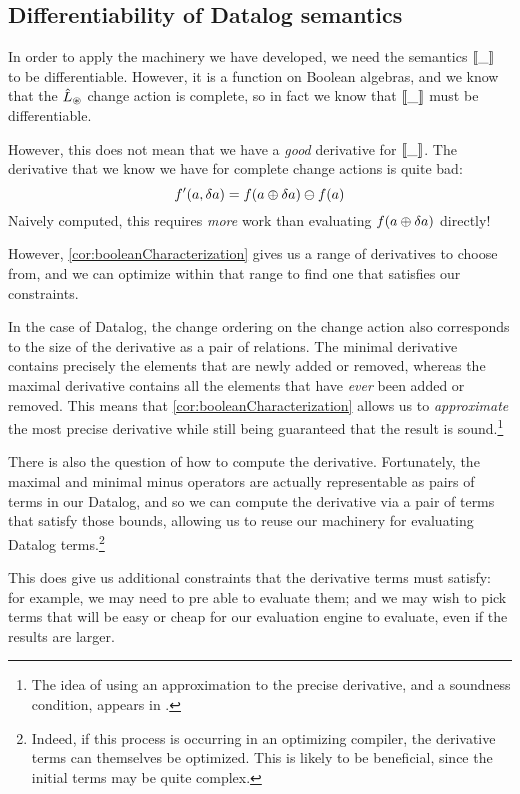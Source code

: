 \subsection{Differentiability of Datalog semantics}
\label{sec:datalogDifferentiability}

In order to apply the machinery we have developed, we need the semantics $\llbracket \_ \rrbracket$ to
be differentiable. However, it is a function on Boolean algebras, and we know
that the $\hat{L}_\circledast$ change action is complete, so in fact we know that
$\llbracket \_ \rrbracket$ must be differentiable.

However, this does not mean that we have a \emph{good} derivative for
$\llbracket \_ \rrbracket$. The derivative that we know we have for complete change actions
is quite bad:
$$f'(a, \delta a) = f(a \oplus \delta a) \ominus f(a)$$
Naively computed, this requires \emph{more} work than evaluating $f(a \oplus \delta a)$ directly!

However, \cref{cor:booleanCharacterization} gives us a range of derivatives to
choose from, and we can optimize within that range to find one that satisfies
our constraints.

In the case of Datalog, the change ordering on the change action also
corresponds to the size of the derivative as a pair of relations. The minimal
derivative contains precisely the elements that are newly added or removed,
whereas the maximal derivative contains all the elements that have \emph{ever}
been added or removed. This means that \cref{cor:booleanCharacterization} allows
us to \emph{approximate} the most precise derivative while still being
guaranteed that the result is sound.\footnote{The idea of using an approximation
to the precise derivative, and a soundness condition, appears in \textcite{bancilhon1986amateur}.}

There is also the question of how to compute the derivative. Fortunately, the
maximal and minimal minus operators are actually representable as pairs of terms
in our Datalog, and so we can compute the derivative via a pair of terms that
satisfy those bounds, allowing us to reuse our machinery for evaluating Datalog
terms.\footnote{Indeed, if this process is occurring in an optimizing compiler,
  the derivative terms can themselves be optimized. This is likely to be
  beneficial, since the initial terms may be quite complex.}

This does give us additional constraints that the derivative terms must satisfy:
for example, we may need to pre
able to evaluate them; and we may wish to pick terms that will be easy or cheap
for our evaluation engine to evaluate, even if the results are larger.

